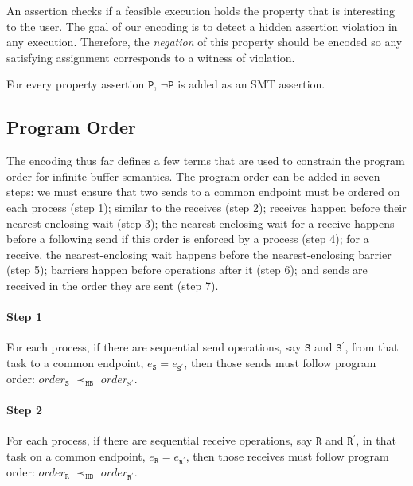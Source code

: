 An assertion checks if a feasible execution holds the property that is interesting to the user. The goal of our encoding is to detect a hidden assertion violation in any execution. Therefore, the \textit{negation} of this property should be encoded so any satisfying assignment corresponds to a witness of violation. 

\begin{definition} \label{def:assert}
For every property assertion $\mathtt{P}$, $\neg \mathtt{P}$ is added as
an SMT assertion.
\end{definition}

\subsection{Program Order}
The encoding thus far defines a few terms that are used to constrain the program order for infinite buffer semantics. The program order can be added in seven steps: we must ensure that two sends to a common endpoint must be ordered on each process (step 1); similar to the receives (step 2); receives happen before their nearest-enclosing wait (step 3); the nearest-enclosing wait for a receive happens before a following send if this order is enforced by a process (step 4); for a receive, the nearest-enclosing wait happens before the nearest-enclosing barrier (step 5); barriers happen before operations after it (step 6); and sends are received in the order they are sent (step 7). 

\paragraph*{Step 1} For each process, if there are sequential send
operations, say $\mathtt{S}$ and $\mathtt{S^\prime}$, from that task
to a common endpoint, $e_\mathtt{S} = e_\mathtt{S^\prime}$, then those
sends must follow program order: $\mathit{order}_\mathtt{S}$
$\prec_\mathtt{HB}$ $\mathit{order}_\mathtt{S^\prime}$.

\paragraph*{Step 2} For each process, if there are sequential receive
operations, say $\mathtt{R}$ and $\mathtt{R^\prime}$, in that task
on a common endpoint, $e_\mathtt{R} = e_\mathtt{R^\prime}$, then those
receives must follow program order: $\mathit{order}_\mathtt{R}$
$\prec_\mathtt{HB}$ $\mathit{order}_\mathtt{R^\prime}$.

